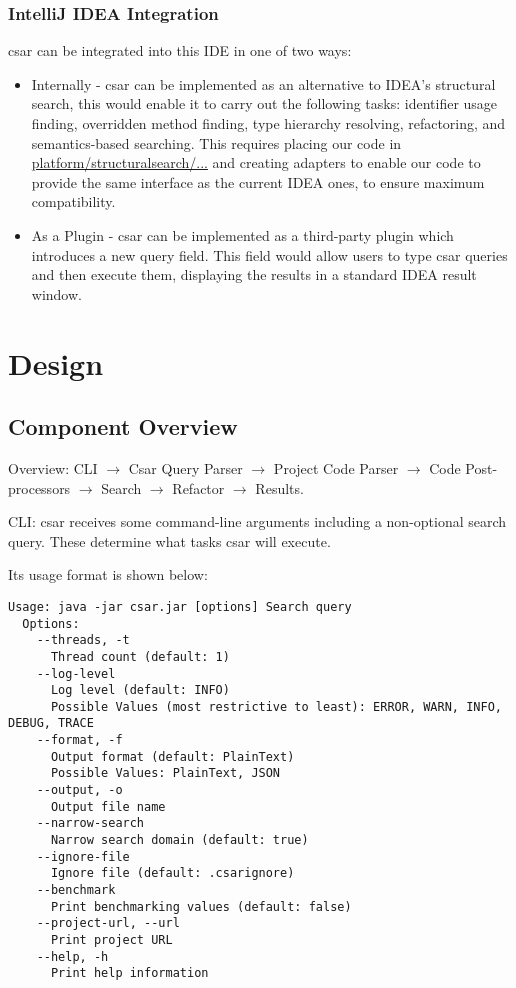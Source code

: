 \documentclass[12pt, letterpaper, oneside]{article}
\begin{document}
\subsubsection{IntelliJ IDEA Integration}
csar can be integrated into this IDE in one of two ways:
\begin{itemize}
    \item Internally - csar can be implemented as an alternative to IDEA's structural search,
    this would enable it to carry out the following tasks:
    identifier usage finding, overridden method finding, type hierarchy resolving, refactoring, and semantics-based searching.
    This requires placing our code in \href{https://github.com/JetBrains/intellij-community/tree/master/platform/structuralsearch/source/com/intellij/structuralsearch}{platform/structuralsearch/...} and creating adapters to enable our code to provide the same interface as the current IDEA ones, to ensure maximum compatibility.
    \item As a Plugin - csar can be implemented as a third-party plugin which introduces a new query field.
    This field would allow users to type csar queries and then execute them, displaying the results in a standard IDEA result window.
\end{itemize}

\section{Design}
\subsection{Component Overview}
Overview:\newline
CLI $\rightarrow$ Csar Query Parser $\rightarrow$ Project Code Parser $\rightarrow$ Code Post-processors $\rightarrow$ Search $\rightarrow$ Refactor $\rightarrow$ Results.

CLI:\newline
csar receives some command-line arguments including a non-optional search query.
These determine what tasks csar will execute.

Its usage format is shown below:
\begin{lstlisting}
Usage: java -jar csar.jar [options] Search query
  Options:
    --threads, -t
      Thread count (default: 1)
    --log-level
      Log level (default: INFO)
      Possible Values (most restrictive to least): ERROR, WARN, INFO, DEBUG, TRACE
    --format, -f
      Output format (default: PlainText)
      Possible Values: PlainText, JSON
    --output, -o
      Output file name
    --narrow-search
      Narrow search domain (default: true)
    --ignore-file
      Ignore file (default: .csarignore)
    --benchmark
      Print benchmarking values (default: false)
    --project-url, --url
      Print project URL
    --help, -h
      Print help information
\end{lstlisting}
\end{document}

